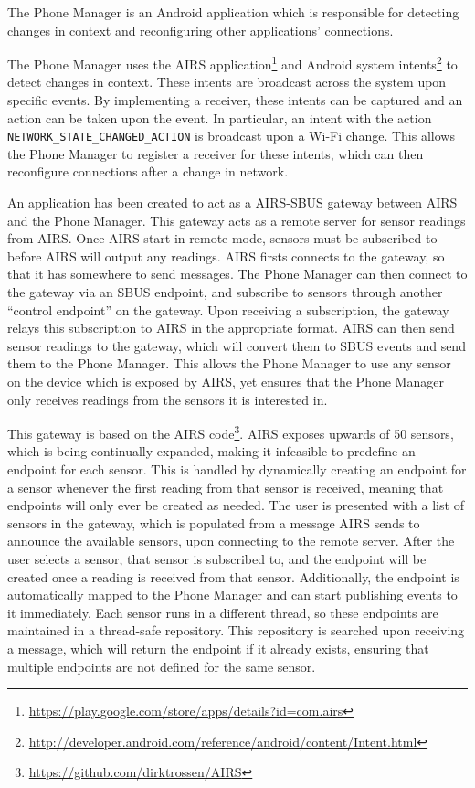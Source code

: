 \documentclass[12pt,twoside,notitlepage]{report}
\begin{document}
The Phone Manager is an Android application which is responsible for detecting changes in context and reconfiguring other applications' connections. 

The Phone Manager uses the AIRS application\footnote{\url{https://play.google.com/store/apps/details?id=com.airs}} and Android system intents\footnote{\url{http://developer.android.com/reference/android/content/Intent.html}} to detect changes in context. 
These intents are broadcast across the system upon specific events. 
By implementing a receiver, these intents can be captured and an action can be taken upon the event. 
In particular, an intent with the action {\tt NETWORK\_STATE\_CHANGED\_ACTION} is broadcast upon a Wi-Fi change.
This allows the Phone Manager to register a receiver for these intents, which can then reconfigure connections after a change in network. 

An application has been created to act as a AIRS-SBUS gateway between AIRS and the Phone Manager. 
This gateway acts as a remote server for sensor readings from AIRS. 
Once AIRS start in remote mode, sensors must be subscribed to before AIRS will output any readings. 
AIRS firsts connects to the gateway, so that it has somewhere to send messages. 
The Phone Manager can then connect to the gateway via an SBUS endpoint, and subscribe to sensors through another ``control endpoint'' on the gateway. 
Upon receiving a subscription, the gateway relays this subscription to AIRS in the appropriate format. 
AIRS can then send sensor readings to the gateway, which will convert them to SBUS events and send them to the Phone Manager. 
This allows the Phone Manager to use any sensor on the device which is exposed by AIRS, yet ensures that the Phone Manager only receives readings from the sensors it is interested in. 
 
This gateway is based on the AIRS code\footnote{\url{https://github.com/dirktrossen/AIRS}}. 
AIRS exposes upwards of 50 sensors, which is being continually expanded, making it infeasible to predefine an endpoint for each sensor. 
This is handled by dynamically creating an endpoint for a sensor whenever the first reading from that sensor is received, meaning that endpoints will only ever be created as needed. 
The user is presented with a list of sensors in the gateway, which is populated from a message AIRS sends to announce the available sensors, upon connecting to the remote server. 
After the user selects a sensor, that sensor is subscribed to, and the endpoint will be created once a reading is received from that sensor. 
Additionally, the endpoint is automatically mapped to the Phone Manager and can start publishing events to it immediately. 
Each sensor runs in a different thread, so these endpoints are maintained in a thread-safe repository. 
This repository is searched upon receiving a message, which will return the endpoint if it already exists, ensuring that multiple endpoints are not defined for the same sensor. 
\end{document}
